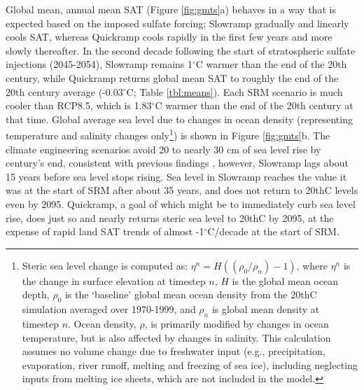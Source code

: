 \documentclass[grl]{AGUTeX}  %
\begin{document}
\begin{article}
Global mean, annual mean SAT (Figure \ref{fig:gmts}a) behaves in a way that is expected based on the imposed sulfate forcing; Slowramp gradually and linearly cools SAT, whereas Quickramp cools rapidly in the first few years and more slowly thereafter. In the second decade following the start of stratospheric sulfate injections (2045-2054), Slowramp remains 1$^\circ$C warmer than the end of the 20th century, while Quickramp returns global mean SAT to roughly the end of the 20th century average (-0.03$^\circ$C; Table \ref{tbl:means}). Each SRM scenario is much cooler than RCP8.5, which is 1.83$^\circ$C warmer than the end of the 20th century at that time. Global average sea level due to changes in ocean density (representing temperature and salinity changes only\footnote{Steric sea level change is computed as: $\eta^n = H((\rho_0 / \rho_n) -1)$, where $\eta^n$ is the change in surface elevation at timestep $n$, $H$ is the global mean ocean depth, $\rho_0$ is the `baseline' global mean ocean density from the 20thC simulation averaged over 1970-1999, and $\rho_n$ is global mean density at timestep $n$. Ocean density, $\rho$, is primarily modified by changes in ocean temperature, but is also affected by changes in salinity. This calculation assumes no volume change due to freshwater input (e.g., precipitation, evaporation, river runoff, melting and freezing of sea ice), including neglecting inputs from melting ice sheets, which are not included in the model.}) is shown in Figure \ref{fig:gmts}b. The climate engineering scenarios avoid 20 to nearly 30 cm of sea level rise by century's end, consistent with previous findings \citep{irvine12}, however, Slowramp lags about 15 years before sea level stops rising. Sea level in Slowramp reaches the value it was at the start of SRM after about 35 years, and does not return to 20thC levels even by 2095. Quickramp, a goal of which might be to immediately curb sea level rise, does just so and nearly returns steric sea level to 20thC by 2095, at the expense of rapid land SAT trends of almost -1$^\circ$C/decade at the start of SRM.   
%
%


\end{article}
\end{document}
